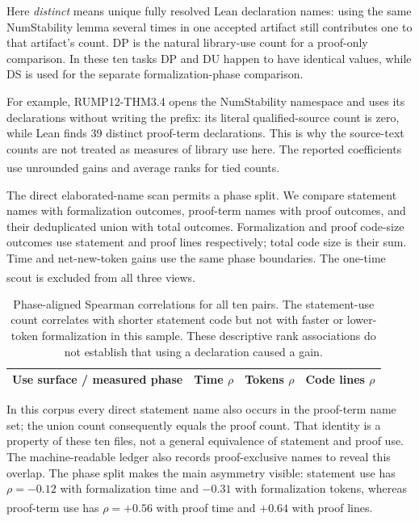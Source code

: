 \documentclass[10pt,a4paper]{article}
\newcommand{\src}[1]{\textsuperscript{\cite{#1}}}
\begin{document}
Here \emph{distinct} means unique fully resolved Lean declaration names:
using the same NumStability lemma several times in one accepted artifact
still contributes one to that artifact's count. DP is the natural
library-use count for a proof-only comparison. In these ten tasks DP and
DU happen to have identical values, while DS is used for the separate
formalization-phase comparison.

For example, RUMP12-THM3.4 opens the NumStability namespace and uses its
declarations without writing the prefix: its literal qualified-source count
is zero, while Lean finds 39 distinct proof-term declarations. This is why
the source-text counts are not treated as measures of library use here.
The reported coefficients use unrounded gains and average ranks for tied counts.
\src{usagepoints,declscan,phasepoints,metriccode,evidence}

The direct elaborated-name scan permits a phase split. We compare
statement names with formalization outcomes, proof-term names with proof
outcomes, and their deduplicated union with total outcomes. Formalization
and proof code-size outcomes use statement and proof lines respectively;
total code size is their sum. Time and net-new-token gains use the same
phase boundaries. The one-time scout is excluded from all three views.
\src{phasepoints,usagepoints,taskledger}

\begin{table}[H]\centering\small
\begin{tabular}{@{}lrrr@{}}\toprule
Use surface / measured phase & Time $\rho$ & Tokens $\rho$ & Code lines $\rho$\\\midrule

\end{tabular}
\caption{Phase-aligned Spearman correlations for all ten pairs. The
statement-use count correlates with shorter statement code but not with
faster or lower-token formalization in this sample. These descriptive
rank associations do not establish that using a declaration caused a gain.
\cite{phasepoints,metriccode}}
\label{tab:phasecorrelations}
\end{table}

In this corpus every direct statement name also occurs in the proof-term
name set; the union count consequently equals the proof count. That
identity is a property of these ten files, not a general equivalence of
statement and proof use. The machine-readable ledger also records
proof-exclusive names to reveal this overlap. The phase split makes the
main asymmetry visible: statement use has $\rho=-0.12$ with formalization
time and $-0.31$ with formalization tokens, whereas proof-term use has
$\rho=+0.56$ with proof time and $+0.64$ with proof lines.\src{phasepoints}
\end{document}
